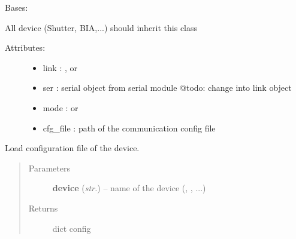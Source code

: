 \documentclass[letterpaper,10pt,english]{sphinxmanual}
\begin{document}
\begin{fulllineitems}
\label{enuActor.Devices:enuActor.Devices.Device.Device}
Bases: {\hyperref[enuActor:enuActor.QThread.QThread]{}}

All device (Shutter, BIA,...) should inherit this class
\begin{description}
\item[{Attributes:}] \leavevmode\begin{itemize}
\item {} 
link : ,  or 

\item {} 
ser : serial object from serial module @todo: change into link object

\item {} 
mode :  or 

\item {} 
cfg\_file : path of the communication config file

\end{itemize}

\end{description}

\begin{fulllineitems}
\label{enuActor.Devices:enuActor.Devices.Device.Device.available_link}
\end{fulllineitems}


\begin{fulllineitems}
\label{enuActor.Devices:enuActor.Devices.Device.Device.load_cfg}
Load configuration file of the device.
\begin{quote}\begin{description}
\item[{Parameters}] \leavevmode
\textbf{device} (\emph{str.}) -- name of the device (, , ...)

\item[{Returns}] \leavevmode
dict config


\end{description}
\end{quote}
\end{fulllineitems}
\end{fulllineitems}
\end{document}
